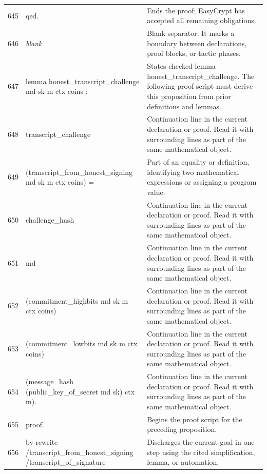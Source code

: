 \documentclass[10pt]{article}
\begin{document}
\begin{longtable}{r L{0.53\textwidth} L{0.37\textwidth}}
645 & {\ttfamily\scriptsize qed.} & Ends the proof; EasyCrypt has accepted all remaining obligations. \\
646 & {\ttfamily\scriptsize \emph{blank}} & Blank separator.  It marks a boundary between declarations, proof blocks, or tactic phases. \\
647 & {\ttfamily\scriptsize lemma honest\_transcript\_challenge md sk m ctx coins :} & States checked lemma honest\_transcript\_challenge.  The following proof script must derive this proposition from prior definitions and lemmas. \\
648 & {\ttfamily\scriptsize   transcript\_challenge} & Continuation line in the current declaration or proof.  Read it with surrounding lines as part of the same mathematical object. \\
649 & {\ttfamily\scriptsize     (transcript\_from\_honest\_signing md sk m ctx coins) =} & Part of an equality or definition, identifying two mathematical expressions or assigning a program value. \\
650 & {\ttfamily\scriptsize   challenge\_hash} & Continuation line in the current declaration or proof.  Read it with surrounding lines as part of the same mathematical object. \\
651 & {\ttfamily\scriptsize     md} & Continuation line in the current declaration or proof.  Read it with surrounding lines as part of the same mathematical object. \\
652 & {\ttfamily\scriptsize     (commitment\_highbits md sk m ctx coins)} & Continuation line in the current declaration or proof.  Read it with surrounding lines as part of the same mathematical object. \\
653 & {\ttfamily\scriptsize     (commitment\_lowbits md sk m ctx coins)} & Continuation line in the current declaration or proof.  Read it with surrounding lines as part of the same mathematical object. \\
654 & {\ttfamily\scriptsize     (message\_hash (public\_key\_of\_secret md sk) ctx m).} & Continuation line in the current declaration or proof.  Read it with surrounding lines as part of the same mathematical object. \\
655 & {\ttfamily\scriptsize proof.} & Begins the proof script for the preceding proposition. \\
656 & {\ttfamily\scriptsize by rewrite /transcript\_from\_honest\_signing /transcript\_of\_signature} & Discharges the current goal in one step using the cited simplification, lemma, or automation. \\

\end{longtable}
\end{document}
